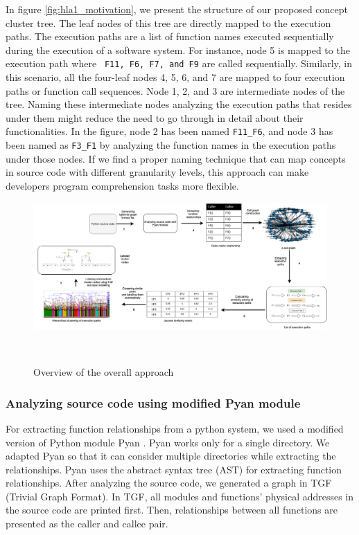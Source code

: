In figure \ref{fig:hla1_motivation}, we present the structure of our proposed concept cluster tree. The leaf nodes of this tree are directly mapped to the execution paths. The execution paths are a list of function names executed sequentially during the execution of a software system. For instance, node 5 is mapped to the execution path where \texttt{ F11, F6, F7, and F9} are called sequentially. Similarly,  in this scenario, all the four-leaf nodes 4, 5, 6, and 7 are mapped to four execution paths or function call sequences. Node 1, 2, and 3 are intermediate nodes of the tree. Naming these intermediate nodes analyzing the execution paths that resides under them might reduce the need to go through in detail about their functionalities. In the figure, node 2 has been named \texttt{F11\_F6}, and node 3 has been named as \texttt{F3\_F1}  by analyzing the function names in the execution paths under those nodes. If we find a proper naming technique that can map concepts in source code with different granularity levels, this approach can make developers program comprehension tasks more flexible.
  

\begin{figure}[tb]
  \centering
  \includegraphics[width=\columnwidth]{figures/hla1/visual_tool_static_call_graph.png}
  \caption{Overview of the overall approach}~\label{fig:overall}
\end{figure}

\subsubsection{Analyzing source code using modified Pyan module}

For extracting function relationships from a python system, we used a modified version of Python module Pyan \cite{pyan}. Pyan works only for a single directory. We adapted Pyan so that it can consider multiple directories while extracting the relationships. Pyan uses the abstract syntax tree (AST) for extracting function relationships. After analyzing the source code, we generated a graph in TGF (Trivial Graph Format). In TGF, all modules and functions' physical addresses in the source code are printed first. Then, relationships between all functions are presented as the caller and callee pair.

